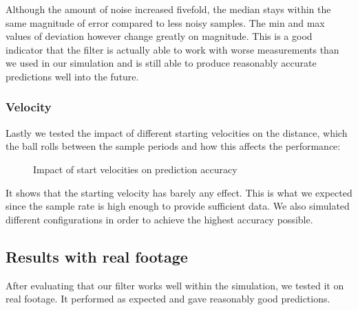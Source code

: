 \documentclass[titlepage, a4paper, 11pt]{scrartcl}
\begin{document}
Although the amount of noise increased fivefold, the median stays within the same magnitude of error compared to less noisy samples. The min and max values of deviation however change greatly on magnitude.
This is a good indicator that the filter is actually able to work with worse measurements than we used in our simulation and is still able to produce reasonably accurate predictions well into the future.

\subsubsection{Velocity}

Lastly we tested the impact of different starting velocities on the distance, which the ball rolls between the sample periods and how this affects the performance:

\begin{figure}[H]
    \centering
    \caption{Impact of start velocities on prediction accuracy}
    \label{fig:velocity300}
\end{figure}

It shows that the starting velocity has barely any effect. 
This is what we expected since the sample rate is high enough to provide sufficient data. 
We also simulated different configurations in order to achieve the highest accuracy possible.

\subsection{Results with real footage}

After evaluating that our filter works well within the simulation, we tested it on real footage. 
It performed as expected and gave reasonably good predictions.
\end{document}
